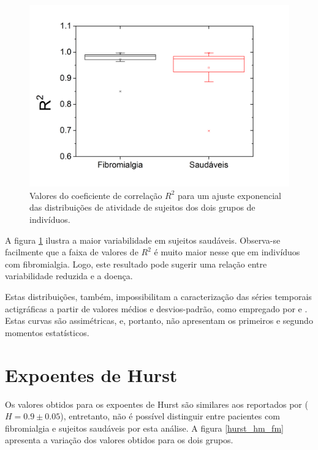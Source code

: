 \documentclass{ufscThesis}
\begin{document}
\begin{figure}[!h]
\centering
\includegraphics[scale=0.3]{rsquared_all.png}
\caption{Valores do coeficiente de correlação $R^2$ para um ajuste exponencial das distribuições de atividade de sujeitos dos dois grupos de indivíduos.}
\label{rsquared_all}
\end{figure}

A figura \ref{rsquared_all} ilustra a maior variabilidade em sujeitos saudáveis. Observa-se facilmente que a faixa de valores de $R^2$ é muito maior nesse que em indivíduos com fibromialgia. Logo, este resultado pode sugerir uma relação entre variabilidade reduzida e a doença. \par
Estas distribuições, também, impossibilitam a caracterização das séries temporais actigráficas a partir de valores médios e desvios-padrão, como empregado por  e . Estas curvas são assimétricas, e, portanto, não apresentam os primeiros e segundo momentos estatísticos.

\section{Expoentes de Hurst}
Os valores obtidos para os expoentes de Hurst são similares aos reportados por  ($H = 0.9 \pm 0.05$), entretanto, não é possível distinguir entre pacientes com fibromialgia e sujeitos saudáveis por esta análise. A figura \ref{hurst_hm_fm} apresenta a variação dos valores obtidos para os dois grupos.
\end{document}
